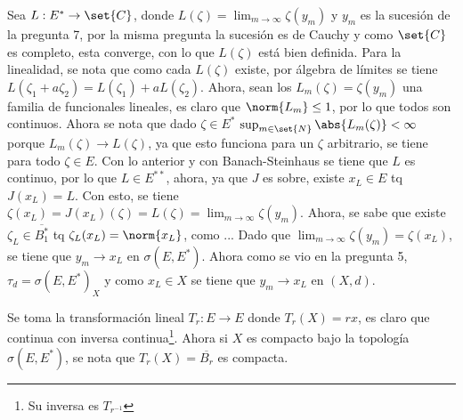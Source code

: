 \documentclass{homework}
\begin{document}
\begin{sol}
    Sea \(L:E^*\rightarrow\set{C}\), donde \(L(\zeta)=\lim_{m\rightarrow\infty}\zeta(y_m)\) y \(y_m\) es la sucesión de la pregunta 7, por la misma pregunta la sucesión es de Cauchy y como \(\set{C}\) es completo, esta converge, con lo que \(L(\zeta)\) está bien definida. Para la linealidad, se nota que como cada \(L(\zeta)\) existe, por álgebra de límites se tiene \(L(\zeta_1+a\zeta_2)=L(\zeta_1)+aL(\zeta_2)\). Ahora, sean los \(L_m(\zeta)=\zeta(y_m)\) una familia de funcionales lineales, es claro que \(\norm{L_m}\leq1\), por lo que todos son continuos. Ahora se nota que dado \(\zeta\in E^*\) \(\sup_{m\in\set{N}}\abs{L_m(\zeta)}<\infty\) porque \(L_m(\zeta)\rightarrow L(\zeta)\), ya que esto funciona para un \(\zeta\) arbitrario, se tiene para todo \(\zeta\in E\). Con lo anterior y con Banach-Steinhaus se tiene que \(L\) es continuo, por lo que \(L\in E^{**}\), ahora, ya que \(J\) es sobre, existe \(x_L\in E\) tq \(J(x_L)=L\). Con esto, se tiene \(\zeta(x_L)=J(x_L)(\zeta)=L(\zeta)=\lim_{m\rightarrow\infty}\zeta(y_m)\). Ahora, se sabe que existe \(\zeta_L\in\overline{B_1^*}\) tq \(\zeta_L(x_L)=\norm{x_L}\), como ... Dado que \(\lim_{m\rightarrow \infty}\zeta(y_m)=\zeta(x_L)\), se tiene que \(y_m\rightarrow x_L\) en \(\sigma(E,E^*)\). Ahora como se vio en la pregunta 5, \(\tau_d=\sigma(E,E^*)_X\) y como \(x_L\in X\) se tiene que \(y_m\rightarrow x_L\) en \((X,d)\).
\end{sol}


\begin{sol}
    Se toma la transformación lineal \(T_r:E\rightarrow E\) donde \(T_r(X)=rx\), es claro que continua con inversa continua\footnote{Su inversa es \(T_{r^{-1}}\)}. Ahora si \(X\) es compacto bajo la topología \(\sigma(E,E^*)\), se nota que \(T_r(X)=\overline{B_r}\) es compacta.
\end{sol}

\begin{sol}
    
\end{sol}

\begin{sol}
    
\end{sol}
\end{document}
